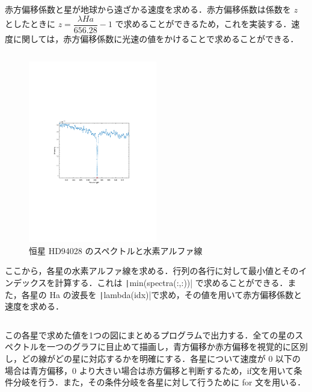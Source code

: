 \documentclass[dvipdfmx, titlepage, t]{jsarticle}
\begin{document}
    赤方偏移係数と星が地球から遠ざかる速度を求める．赤方偏移係数は係数を $z$ としたときに $z = \dfrac{\lambda Ha }{656.28} - 1$ で求めることができるため，これを実装する．速度に関しては，赤方偏移係数に光速の値をかけることで求めることができる．
    \inputminted[linenos, firstline=29, lastline=31, frame=lines, fontsize=\small]{matlab}{code/Exp3_6_Matlab.m}

    \begin{figure}[H]
        \centering
        \includegraphics[width=0.5\textwidth]{figure/stellar1.pdf}
        \caption{恒星 HD94028 のスペクトルと水素アルファ線}
        \label{fig:exp3_6_spectra}
    \end{figure}

    ここから，各星の水素アルファ線を求める．行列の各行に対して最小値とそのインデックスを計算する．これは \texttt|min(spectra(:,:))| で求めることができる．また，各星の Ha の波長を \texttt|lambda(idx)|で求め，その値を用いて赤方偏移係数と速度を求める．

    \inputminted[linenos, firstline=11, lastline=15, frame=lines, fontsize=\small]{matlab}{code/Exp3_6_2_Matlab.m}

    この各星で求めた値を1つの図にまとめるプログラムで出力する．全ての星のスペクトルを一つのグラフに目止めて描画し，青方偏移か赤方偏移を視覚的に区別し，どの線がどの星に対応するかを明確にする．各星について速度が 0 以下の場合は青方偏移，0 より大きい場合は赤方偏移と判断するため，if文を用いて条件分岐を行う．また，その条件分岐を各星に対して行うために for 文を用いる．
    \inputminted[linenos, firstline=16, lastline=27, frame=lines, fontsize=\small]{matlab}{code/Exp3_6_2_Matlab.m}
\end{document}

